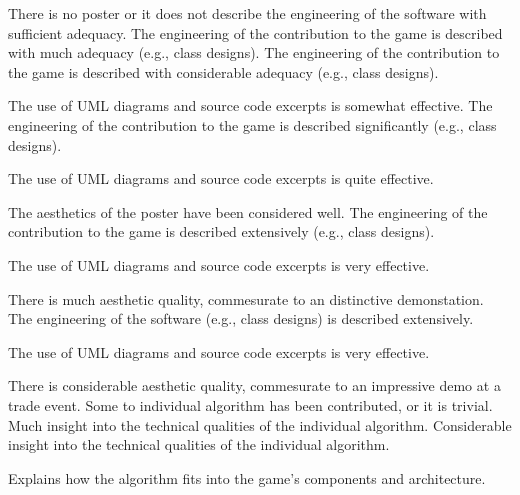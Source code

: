 \documentclass{../../fal_assignment}
\begin{document}
\begin{markingrubric}
%
        \grade\fail There is no poster or it does not describe the engineering of the software with sufficient adequacy. 
        \grade The engineering of the contribution to the game is described with much adequacy (e.g., class designs).
        \grade The engineering of the contribution to the game is described with considerable adequacy (e.g., class designs).
            \par The use of UML diagrams and source code excerpts is somewhat effective.
        \grade The engineering of the contribution to the game is described significantly (e.g., class designs).
            \par The use of UML diagrams and source code excerpts is quite effective.
            \par The aesthetics of the poster have been considered well.
        \grade The engineering of the contribution to the game is described extensively (e.g., class designs).
            \par The use of UML diagrams and source code excerpts is very effective.
            \par There is much aesthetic quality, commesurate to an distinctive demonstation.
        \grade The engineering of the software (e.g., class designs) is described extensively.
            \par The use of UML diagrams and source code excerpts is very effective.
            \par There is considerable aesthetic quality, commesurate to an impressive demo at a trade event.
%
        \grade\fail Some to individual algorithm has been contributed, or it is trivial.
        \grade Much insight into the technical qualities of the individual algorithm.
        \grade Considerable insight into the technical qualities of the individual algorithm.
            \par Explains how the algorithm fits into the game's components and architecture.

\end{markingrubric}
\end{document}
